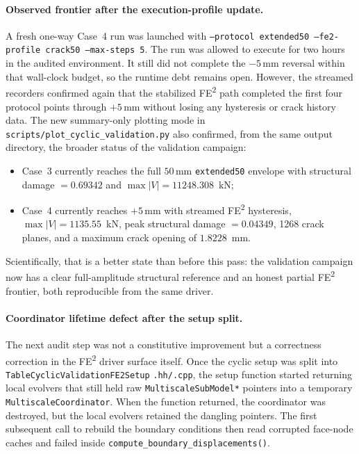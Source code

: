 \paragraph{Observed frontier after the execution-profile update.}
A fresh one-way Case~4 run was launched with
\texttt{--protocol extended50 --fe2-profile crack50 --max-steps 5}.  The run
was allowed to execute for two hours in the audited environment.  It still did
not complete the \(-5\)\,mm reversal within that wall-clock budget, so the
runtime debt remains open.  However, the streamed recorders confirmed again
that the stabilized FE\textsuperscript{2} path completed the first four
protocol points through \(+5\)\,mm without losing any hysteresis or crack
history data.  The new summary-only plotting mode in
\texttt{scripts/plot\_cyclic\_validation.py} also confirmed, from the same
output directory, the broader status of the validation campaign:
\begin{itemize}
  \item Case~3 currently reaches the full \(50\)\,mm
    \texttt{extended50} envelope with structural damage
    \(= 0.69342\) and \(\max |V| = 11248.308\)~kN;
  \item Case~4 currently reaches \(+5\)\,mm with streamed FE\textsuperscript{2}
    hysteresis, \(\max |V| = 1135.55\)~kN, peak structural damage
    \(= 0.04349\), 1268 crack planes, and a maximum crack opening of
    \(1.8228\)~mm.
\end{itemize}
Scientifically, that is a better state than before this pass: the validation
campaign now has a clear full-amplitude structural reference and an honest
partial FE\textsuperscript{2} frontier, both reproducible from the same driver.

\paragraph{Coordinator lifetime defect after the setup split.}
The next audit step was not a constitutive improvement but a correctness
correction in the FE\textsuperscript{2} driver surface itself.  Once the cyclic
setup was split into \texttt{TableCyclicValidationFE2Setup}\allowbreak
\texttt{.hh/.cpp}, the setup function started returning local evolvers that
still held raw \texttt{MultiscaleSubModel*} pointers into a temporary
\texttt{MultiscaleCoordinator}.  When the function returned, the coordinator
was destroyed, but the local evolvers retained the dangling pointers.  The
first subsequent call to rebuild the boundary conditions then read corrupted
face-node caches and failed inside
\texttt{compute\_boundary\_displacements()}.

